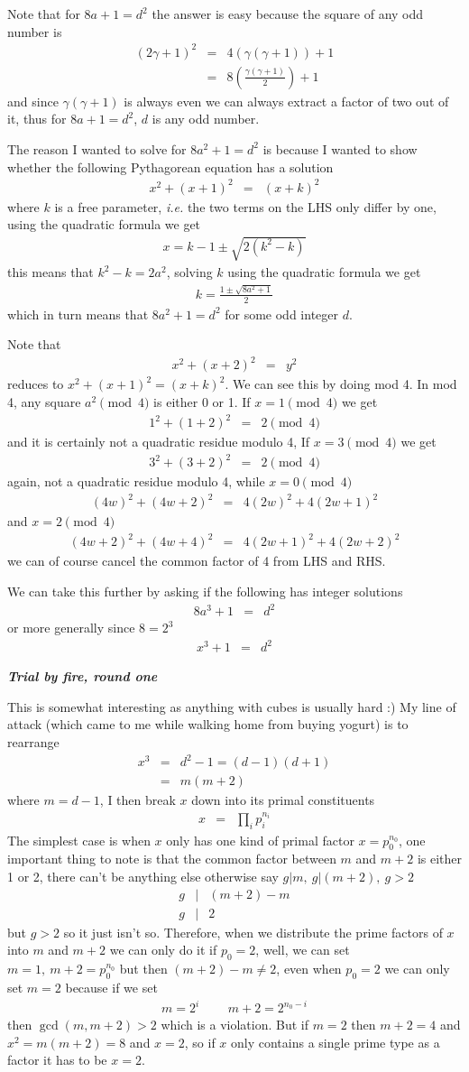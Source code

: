 \documentclass[aps,preprint,preprintnumbers,nofootinbib,showpacs,prd]{revtex4-1}
\newcommand{\ie}{{\it i.e.} }
\newcommand{\nbea}{\begin{eqnarray*}}
\newcommand{\neea}{\end{eqnarray*}}
\begin{document}
Note that for $8a + 1 = d^2$ the answer is easy because the square of any odd number is
%
\nbea
(2\gamma + 1)^2 & = & 4 (\gamma(\gamma+1)) + 1 \\
& = & 8 \left (\frac{\gamma(\gamma+1)}{2} \right ) + 1
\neea
%
and since $\gamma(\gamma+1)$ is always even we can always extract a factor of two out of it, thus for $8a + 1 = d^2$, $d$ is any odd number.

The reason I wanted to solve for $8a^2 + 1 = d^2$ is because I wanted to show whether the following Pythagorean equation has a solution
%
\nbea
x^2 + (x+1)^2 & = & (x+k)^2
\neea
%
where $k$ is a free parameter, \ie the two terms on the LHS only differ by one, using the quadratic formula we get
%
\nbea
x = k-1 \pm \sqrt{2(k^2 - k)}
\neea
%
this means that $k^2 - k = 2a^2$, solving $k$ using the quadratic formula we get
%
\nbea
k = \frac{1 \pm \sqrt{8a^2 + 1}}{2}
\neea
%
which in turn means that $8a^2 + 1 = d^2$ for some odd integer $d$.

Note that
%
\nbea
x^2 + (x+2)^2 & = & y^2
\neea
%
reduces to $x^2 + (x+1)^2 = (x+k)^2$. We can see this by doing mod 4. In mod 4, any square $a^2 \pmod{4}$ is either 0 or 1. If $x = 1 \pmod{4}$ we get
%
\nbea
1^2 + (1+2)^2 & = & 2 \pmod{4}
\neea
%
and it is certainly not a quadratic residue modulo 4, If $x = 3 \pmod{4}$ we get
%
\nbea
3^2 + (3+2)^2 & = & 2 \pmod{4}
\neea
%
again, not a quadratic residue modulo 4, while $x = 0 \pmod{4}$
%
\nbea
(4w)^2 + (4w+2)^2 & = & 4 (2w)^2 + 4 (2w+1)^2
\neea
%
and $x = 2 \pmod{4}$
%
\nbea
(4w + 2)^2 + (4w+4)^2 & = & 4 (2w+1)^2 + 4 (2w+2)^2
\neea
we can of course cancel the common factor of 4 from LHS and RHS.

We can take this further by asking if the following has integer solutions
%
\nbea
8a^3 + 1 & = & d^2
\neea
%
or more generally since $8 = 2^3$
%
\nbea
x^3 + 1 & = & d^2
\neea
%

\bigskip
\textit{\textbf{Trial by fire, round one}}
\smallskip

This is somewhat interesting as anything with cubes is usually hard :) My line of attack (which came to me while walking home from buying yogurt) is to rearrange
%
\nbea
x^3 & = & d^2 - 1 = (d-1)(d+1) \\
& = & m(m + 2)
\neea
%
where $m = d - 1$, I then break $x$ down into its primal constituents
%
\nbea
x & = & \prod_{i} p_i^{n_i}
\neea
%
The simplest case is when $x$ only has one kind of primal factor $x = p_0^{n_0}$, one important thing to note is that the common factor between $m$ and $m+2$ is either 1 or 2, there can't be anything else otherwise say $g|m, ~ g|(m+2), ~ g > 2$
%
\nbea
g & | & (m + 2) - m \\
g & | & 2
\neea
%
but $g > 2$ so it just isn't so. Therefore, when we distribute the prime factors of $x$ into $m$ and $m+2$ we can only do it if $p_0 = 2$, well, we can set $m = 1, ~ m + 2 = p_0^{n_0}$ but then $(m + 2)  - m\neq 2$, even when $p_0 = 2$ we can only set $m = 2$ because if we set
%
\nbea
m = 2^i & ~~~ & m + 2 = 2^{n_0 - i}
\neea
%
then $\gcd(m, m + 2) > 2$ which is a violation. But if $m = 2$ then $m + 2 = 4$ and $x^2 = m(m + 2) = 8$ and $x = 2$, so if $x$ only contains a single prime type as a factor it has to be $x=2$.
\end{document}
